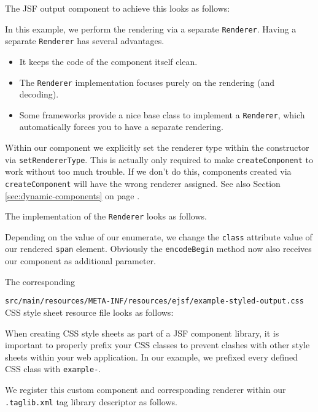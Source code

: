 The JSF output component to achieve this looks as follows:

In this example, we perform the rendering via a separate \texttt{Renderer}.
Having a separate \texttt{Renderer} has several advantages.
\begin{itemize}
	\item It keeps the code of the component itself clean.
	\item The \texttt{Renderer} implementation focuses purely on the rendering (and decoding).
	\item Some frameworks provide a nice base class to implement a \texttt{Renderer}, which automatically forces you to have a separate rendering.
\end{itemize}
Within our component we explicitly set the renderer type within the constructor via \texttt{setRendererType}.
This is actually only required to make \texttt{createComponent} to work without too much trouble.
If we don't do this, components created via \texttt{createComponent} will have the wrong renderer assigned.
See also Section \ref{sec:dynamic-components}  on page \pageref{sec:dynamic-components}.

The implementation of the \texttt{Renderer} looks as follows.

Depending on the value of our enumerate, we change the \texttt{class} attribute value of our rendered \texttt{span} element.
Obviously the \texttt{encodeBegin} method now also receives our component as additional parameter.

The corresponding

\texttt{src/main/resources/META-INF/resources/ejsf/example-styled-output.css} CSS style sheet resource file looks as follows:

When creating CSS style sheets as part of a JSF component library, it is important to properly prefix your CSS classes to prevent clashes with other style sheets within your web application.
In our example, we prefixed every defined CSS class with \texttt{example-}.

We register this custom component and corresponding renderer within our \texttt{.taglib.xml} tag library descriptor as follows.


